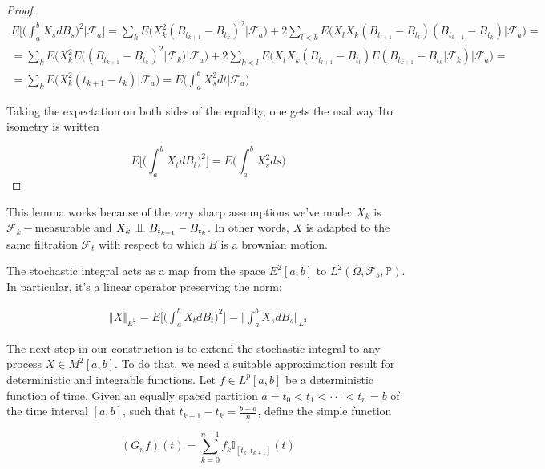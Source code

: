 \begin{proof}
    \begin{gather*}
        E\Bigg[ \Bigg(\int_a^b X_s d B_s \Bigg)^2 \big\vert \mathcal{F}_a \Bigg] = \sum_k E\Big( X_k^2 (B_{t_{k+1}}-B_{t_k})^2 \big\vert \mathcal{F}_a \Big) + 2\sum_{l < k} E\Big( X_l X_k (B_{t_{l+1}} - B_{t_l}) (B_{t_{k+1}}-B_{t_k}) \big\vert \mathcal{F}_a \Big) = \\
        = \sum_{k} E\Big( X_k^2 E\big( (B_{t_{k+1}}-B_{t_k})^2 \vert \mathcal{F}_k \big) \big\vert \mathcal{F}_a \Big) + 2 \sum_{k < l} E\Big( X_l X_k (B_{t_{l+1}}-B_{t_l}) E( B_{t_{k+1}}-B_{t_k} \vert \mathcal{F}_k) \big\vert \mathcal{F}_a\Big) = \\
        = \sum_k E\big( X_k^2 (t_{k+1}-t_k) \vert \mathcal{F}_a) = E \Bigg( \int_a^b X_s^2 dt \Big\vert \mathcal{F}_a \Bigg)
    \end{gather*}

    Taking the expectation on both sides of the equality, one gets the usal way Ito isometry is written 

    \begin{equation}
        E\Bigg[\Bigg( \int_a^b X_t dB_t \Bigg)^2 \Bigg] = E\Bigg( \int_a^b X_s^2 ds \Bigg)
    \end{equation}
\end{proof}

This lemma works because of the very sharp assumptions we've made: $X_k$ is $\mathcal{F}_k-$measurable and $X_k \perp \!\!\! \perp B_{t_{k+1}}-B_{t_k}$. In other words, $X$ is adapted to the same filtration $\mathcal{F}_t$ with respect to which $B$ is a brownian motion. 

The stochastic integral acts as a map from the space $E^2[a,b]$ to $L^2(\Omega,\mathcal{F}_b,\mathbb{P})$. In particular, it's a linear operator preserving the norm: 

\begin{gather*}
    \Vert X \Vert_{E^2} = E\Bigg[\Bigg( \int_a^b X_t dB_t \Bigg)^2 \Bigg] = \Bigg\Vert \int_a^b X_s dB_s \Bigg\Vert_{L^2}
\end{gather*}

The next step in our construction is to extend the stochastic integral to any process $X \in M^2[a,b]$. To do that, we need a suitable approximation result for deterministic and integrable functions. Let $f \in L^p[a,b]$ be a deterministic function of time. Given an equally spaced partition $a = t_0 < t_1 < \cdot\cdot\cdot < t_n = b$ of the time interval $[a,b]$, such that $t_{k+1}-t_k = \frac{b-a}{n}$, define the simple function 

\begin{equation}
    (G_n f)(t) = \sum_{k=0}^{n-1} f_k \mathbb{I}_{[t_k,t_{k+1}]}(t)
\end{equation}

